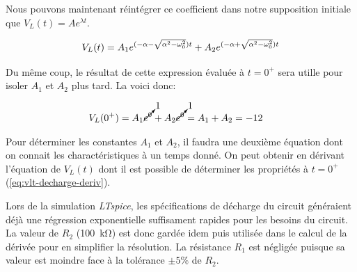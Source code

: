 \documentclass[a11paper, 11pt]{article}
\newcommand{\vlt}{V_L(t)}
\newcommand{\vlz}{V_L(0^+)}
\newcommand{\al}{\alpha}
\newcommand{\la}{\lambda}
\newcommand{\ws}{\omega_{0}^2}
\newcommand{\rootd}{\sqrt{\al^2-\ws}}
\begin{document}
\begin{appendix}
	Nous pouvons maintenant réintégrer
	ce coefficient dans notre supposition initiale que $\vlt=Ae^{\la t}$.

	\begin{equation}
		\vlt = A_1e^{(-\al-\rootd)t} + A_2e^{(-\al+\rootd)t} \\
		\label{eq:vl_straight_decharge}
	\end{equation}

	Du même coup, le résultat de cette expression évaluée à $t=0^+$ sera utille pour isoler $A_1$ et $A_2$
	plus tard. La voici donc:

	\begin{gather*}
		\begin{align}
			\vlz & = A_1\cancelto{1}{e^0} + A_2\cancelto{1}{e^0} = A_1 + A_2 = -12
		\end{align}
	\end{gather*}

	Pour déterminer les constantes $A_1$ et $A_2$, il faudra une deuxième équation dont on connait les
	charactéristiques à un temps donné. On peut obtenir en dérivant l'équation de $\vlt$ dont
	il est possible de déterminer les propriétés à $t=0^+$ (\cref{eq:vlt-decharge-deriv}).

	Lors de la simulation \textit{LTspice}, les spécifications de décharge du circuit généraient déjà une
	régression exponentielle suffisament rapides pour les besoins du circuit. La valeur de $R_2$ (\SI{100}{\kohm})
	est donc gardée idem puis utilisée dans le calcul de la dérivée pour en simplifier la résolution. La résistance $R_1$
	est négligée puisque sa valeur est moindre face à la tolérance $\pm 5\%$ de $R_2$.


\end{appendix}
\end{document}

